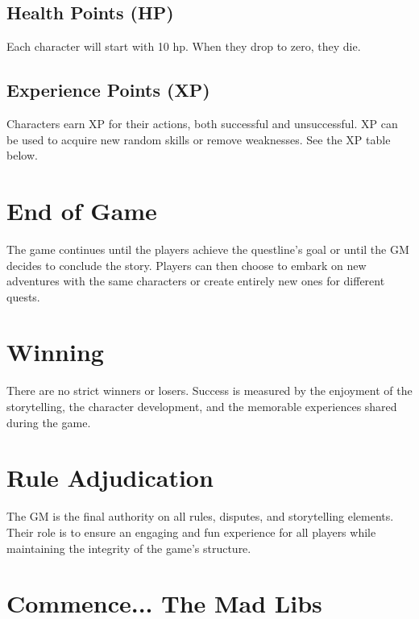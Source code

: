 \documentclass{article}
\begin{document}
\subsection*{Health Points (HP)}

Each character will start with 10 hp. When they drop to zero, they die.

\subsection*{Experience Points (XP)}

Characters earn XP for their actions, both successful and unsuccessful. XP can be used to acquire new random skills or remove weaknesses. See the XP table below.

\section*{End of Game}

The game continues until the players achieve the questline's goal or until the GM decides to conclude the story. Players can then choose to embark on new adventures with the same characters or create entirely new ones for different quests.

\section*{Winning}

There are no strict winners or losers. Success is measured by the enjoyment of the storytelling, the character development, and the memorable experiences shared during the game.

\section*{Rule Adjudication}

The GM is the final authority on all rules, disputes, and storytelling elements. Their role is to ensure an engaging and fun experience for all players while maintaining the integrity of the game's structure.

\newpage

\section*{Commence... The Mad Libs}
\end{document}
